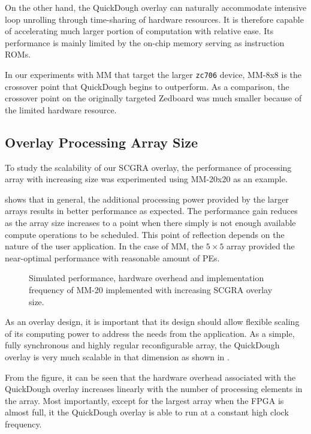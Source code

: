 On the other hand, the QuickDough overlay can naturally accommodate intensive loop unrolling through
time-sharing of hardware resources. It is therefore capable of accelerating much larger portion of
computation with relative ease. Its performance is mainly limited by the on-chip memory serving as
instruction ROMs.

In our experiments with MM that target the larger \texttt{zc706} device, MM-8x8 is the crossover point that QuickDough begins to outperform.  As a comparison, the crossover point on the originally targeted Zedboard was much smaller because of the limited hardware resource.


\subsection{Overlay Processing Array Size}
To study the scalability of our SCGRA overlay, the performance of processing array with increasing size was experimented using MM-20x20 as an example.

 shows that in general, the additional processing power provided by the larger arrays results in better performance as expected.
The performance gain reduces as the array size increases to a point when there simply is not enough available compute operations to be scheduled.
This point of reflection depends on the nature of the user application.
In the case of MM, the $5 \times 5$ array provided the near-optimal performance with reasonable amount of PEs.

\begin{figure}
\centering
{}
\hfill
{}
\caption{Simulated performance, hardware overhead and implementation frequency of MM-20 implemented with increasing SCGRA overlay size.}

\end{figure}


As an overlay design, it is important that its design should allow flexible scaling of its computing power to address the needs from the application.
As a simple, fully synchronous and highly regular reconfigurable array, the QuickDough overlay is very much scalable in that dimension as shown in 
.

From the figure, it can be seen that the hardware overhead associated with the QuickDough overlay increases linearly with the number of processing elements in the array.  Most importantly, except for the largest array when the FPGA is almost full, it the QuickDough overlay is able to run at a constant high clock frequency.

